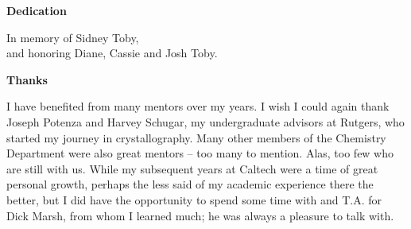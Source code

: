 \newpage
\vspace*{\fill}

\begin{center}
{\LARGE\bfseries Dedication}
\end{center}
\vspace{2\baselineskip}
\begin{center}
    
In memory of Sidney Toby,\\
and honoring Diane, Cassie and Josh Toby.
\end{center}
\vspace{\fill}

\newpage
\begin{center}
{\LARGE\bfseries Thanks}
\end{center}
\vspace{2\baselineskip}

I have benefited from many mentors over my years. I wish I could again thank Joseph Potenza and Harvey Schugar, my undergraduate advisors at Rutgers, who started my journey in crystallography. Many other members of the Chemistry Department were also great mentors -- too many to mention. Alas, too few who are still with us. While my subsequent years at Caltech were a time of great personal growth, perhaps the less said of my academic experience there the better, but I did have the opportunity to spend some time with and T.A. for Dick Marsh, from whom I learned much; he was always a pleasure to talk with. 

